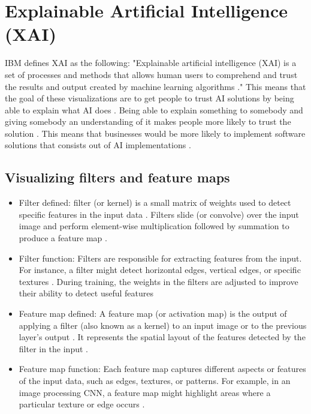 \documentclass[a4paper,oneside,11pt]{book}
\begin{document}
\section{Explainable Artificial Intelligence (XAI)}
IBM defines XAI as the following: "Explainable artificial intelligence (XAI) is a set of processes and methods that allows human users to comprehend and trust the results and output created by machine learning algorithms \citep{IBM_XAI}."
This means that the goal of these visualizations are to get people to trust AI solutions by being able to explain what AI does \citep{IBM_XAI}. Being able to explain something to somebody and giving somebody an understanding of it makes people more likely to trust the solution \citep{IBM_XAI}. This means that businesses would be more likely to implement software solutions that consists out of AI implementations \citep{IBM_XAI}.
\subsection{Visualizing filters and feature maps}
\begin{itemize}
    \item Filter defined: filter (or kernel) is a small matrix of weights used to detect specific features in the input data \citep{vestias2020featuremap}. Filters slide (or convolve) over the input image and perform element-wise multiplication followed by summation to produce a feature map \citep{vestias2020featuremap}.
    \item Filter function:  Filters are responsible for extracting features from the input. For instance, a filter might detect horizontal edges, vertical edges, or specific textures \citep{vestias2020featuremap}. During training, the weights in the filters are adjusted to improve their ability to detect useful features \citep{vestias2020featuremap}
    \item Feature map defined: A feature map (or activation map) is the output of applying a filter (also known as a kernel) to an input image or to the previous layer's output \citep{vestias2020featuremap}. It represents the spatial layout of the features detected by the filter in the input \citep{vestias2020featuremap}.
    \item Feature map function: Each feature map captures different aspects or features of the input data, such as edges, textures, or patterns. For example, in an image processing CNN, a feature map might highlight areas where a particular texture or edge occurs \citep{brownlee2019visualize}.
\end{itemize}
\end{document}

